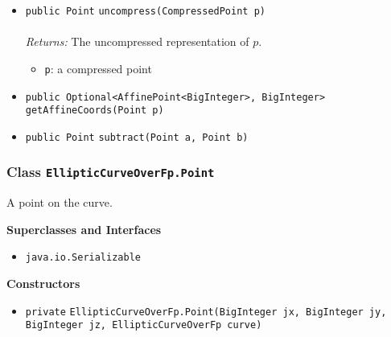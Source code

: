\begin{itemize}
\item \lstinline|public Point| \lstinline|uncompress|\lstinline|(CompressedPoint p)|\\ \\[-0.6em]
\emph{Returns:} The uncompressed representation of $p$.
\begin{itemize}
\item \lstinline|p|: a compressed point
\end{itemize}



\item \lstinline|public Optional<AffinePoint<BigInteger>, BigInteger>| \lstinline|getAffineCoords|\lstinline|(Point p)| \\[-0.6em]




\item \lstinline|public Point| \lstinline|subtract|\lstinline|(Point a, Point b)| \\[-0.6em]




\end{itemize}

\subsubsection{Class \lstinline|EllipticCurveOverFp.Point|}
A point on the curve. \\
\noindent\begin{minipage}[t]{5cm}
\vspace{0.3em}
\hspace*{2em}
\vspace{0.3em}
\end{minipage}



\textbf{\sffamily Superclasses and Interfaces}
\begin{itemize}
\item \lstinline|java.io.Serializable|
\end{itemize}


\textbf{\sffamily Constructors}
\begin{itemize}
\item \lstinline|private| \lstinline|EllipticCurveOverFp.Point|\lstinline|(BigInteger jx, BigInteger jy, BigInteger jz, EllipticCurveOverFp curve)| \\[-0.6em]




\end{itemize}


